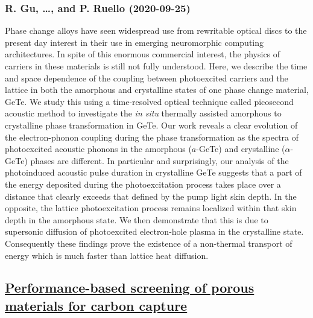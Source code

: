\subsubsection*{R. Gu, \dots, and P. Ruello (2020-09-25)}
Phase change alloys have seen widespread use from rewritable optical discs to
the present day interest in their use in emerging neuromorphic computing
architectures. In spite of this enormous commercial interest, the physics of
carriers in these materials is still not fully understood. Here, we describe
the time and space dependence of the coupling between photoexcited carriers and
the lattice in both the amorphous and crystalline states of one phase change
material, GeTe. We study this using a time-resolved optical technique called
picosecond acoustic method to investigate the \textit{in situ} thermally
assisted amorphous to crystalline phase transformation in GeTe. Our work
reveals a clear evolution of the electron-phonon coupling during the phase
transformation as the spectra of photoexcited acoustic phonons in the amorphous
($a$-GeTe) and crystalline ($\alpha$-GeTe) phases are different. In particular
and surprisingly, our analysis of the photoinduced acoustic pulse duration in
crystalline GeTe suggests that a part of the energy deposited during the
photoexcitation process takes place over a distance that clearly exceeds that
defined by the pump light skin depth. In the opposite, the lattice
photoexcitation process remains localized within that skin depth in the
amorphous state. We then demonstrate that this is due to supersonic diffusion
of photoexcited electron-hole plasma in the crystalline state. Consequently
these findings prove the existence of a non-thermal transport of energy which
is much faster than lattice heat diffusion.

\subsection*{\href{http://arxiv.org/abs/2009.12289v1}{Performance-based screening of porous materials for carbon capture}}
